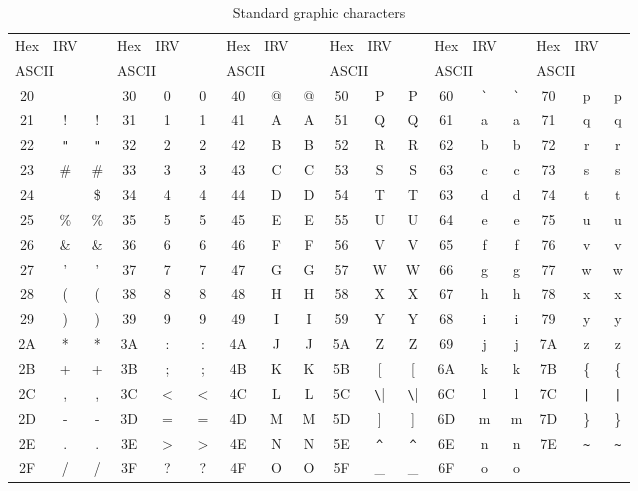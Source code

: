\begin{table}[ht]
  \begin{center}
	\caption{Standard graphic characters}
	\label{table:ASCII}
	\small
	\begin{tabular}{cc@{}c|cc@{}c|cc@{}c|cc@{}c|cc@{}c|cc@{}c}
	\hline\hline
	Hex & IRV && Hex & IRV && Hex & IRV && Hex & IRV && Hex & IRV && Hex & IRV \\
	\multicolumn{3}{l|}{ASCII} &
	\multicolumn{3}{l|}{ASCII} &
	\multicolumn{3}{l|}{ASCII} &
	\multicolumn{3}{l|}{ASCII} &
	\multicolumn{3}{l|}{ASCII} &
	\multicolumn{3}{l}{ASCII} \\
	\hline
	20&   &		&30& 0 & 0	&40& @ & @	&50& P & P	&60& \verb|`| & \verb|`|
																&70& p & p	\\
	21& ! & !	&31& 1 & 1	&41& A & A	&51& Q & Q	&61& a & a	&71& q & q	\\
	22& \verb|"| & \verb|"|
				&32& 2 & 2	&42& B & B	&52& R & R	&62& b & b	&72& r & r	\\
	23& \# & \# &33& 3 & 3	&43& C & C	&53& S & S	&63& c & c	&73& s & s	\\
	24& \textcurrency  & \$ &34& 4 & 4	&44& D & D	&54& T & T	&63& d & d	&74& t & t	\\
	25& \% & \% &35& 5 & 5	&45& E & E	&55& U & U	&64& e & e	&75& u & u	\\
	26& \& & \& &36& 6 & 6	&46& F & F	&56& V & V	&65& f & f	&76& v & v	\\
	27& '  & '	&37& 7 & 7	&47& G & G	&57& W & W	&66& g & g	&77& w & w	\\
	28& (  & (	&38& 8 & 8	&48& H & H	&58& X & X	&67& h & h	&78& x & x	\\
	29& )  & )	&39& 9 & 9	&49& I & I	&59& Y & Y	&68& i & i	&79& y & y	\\
	2A& *  & *	&3A& : & :	&4A& J & J	&5A& Z & Z	&69& j & j	&7A& z & z	\\
	2B& +  & +	&3B& ; & ;	&4B& K & K	&5B& [ & [	&6A& k & k	&7B& \{&\{	\\
	2C& ,  & ,	&3C&$<$&$<$	&4C& L & L	&5C& \verb|\| & \verb|\|
													&6C& l & l	&7C& \verb"|" & \verb"|" \\
	2D& -  & -	&3D& = & =	&4D& M & M	&5D& ] & ]	&6D& m & m	&7D& \}&\}	\\
	2E& .  & .	&3E&$>$&$>$	&4E& N & N	&5E& \verb|^| & \verb|^|
													&6E& n & n	&7E& \verb|~| & \verb|~| \\
	2F& /  & /	&3F& ? & ?	&4F& O & O	&5F& \_ & \_&6F& o & o	\\
	\hline\hline
	\end{tabular}
  \end{center}
\end{table}

